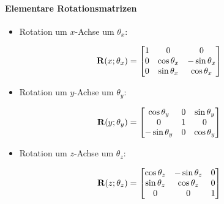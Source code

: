 			\paragraph{Elementare Rotationsmatrizen}
				\begin{itemize}
					\item Rotation um \(x\)-Achse um \(\theta_x\):
				\end{itemize}
				\begin{equation*}
					\boldsymbol{\mathrm{R}}(x; \theta_x) =
						\begin{bmatrix}
							1 & 0            & 0             \\
							0 & \cos\theta_x & -\sin\theta_x \\
							0 & \sin\theta_x & \cos\theta_x
						\end{bmatrix}
				\end{equation*}
				\begin{itemize}
					\item Rotation um \(y\)-Achse um \(\theta_y\):
				\end{itemize}
				\begin{equation*}
					\boldsymbol{\mathrm{R}}(y; \theta_y) =
						\begin{bmatrix}
							\cos\theta_y  & 0 & \sin\theta_y \\
							0             & 1 & 0            \\
							-\sin\theta_y & 0 & \cos\theta_y
						\end{bmatrix}
				\end{equation*}
				\begin{itemize}
					\item Rotation um \(z\)-Achse um \(\theta_z\):
				\end{itemize}
				\begin{equation*}
					\boldsymbol{\mathrm{R}}(z; \theta_z) =
						\begin{bmatrix}
							\cos\theta_z & -\sin\theta_z & 0 \\
							\sin\theta_z & \cos\theta_z  & 0 \\
							0            & 0             & 1
						\end{bmatrix}
				\end{equation*}


